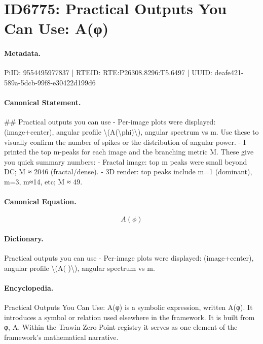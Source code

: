 \section*{ID6775: Practical Outputs You Can Use: A(φ)}
\paragraph{Metadata.}
PiID: 9554495977837 | RTEID: RTE:P26308.8296:T5.6497 | UUID: deafe421-589a-5dcb-99f8-e30422d199d6

\paragraph{Canonical Statement.}
\#\# Practical outputs you can use - Per-image plots were displayed: (image+center), angular profile \textbackslash{}(A(\textbackslash{}phi)\textbackslash{}), angular spectrum vs m. Use these to visually confirm the number of spikes or the distribution of angular power. - I printed the top m-peaks for each image and the branching metric M. These give you quick summary numbers: - Fractal image: top m peaks were small beyond DC; M ≈ 2046 (fractal/dense). - 3D render: top peaks include m=1 (dominant), m=3, m≈14, etc; M ≈ 49.

\paragraph{Canonical Equation.}
\[
A(\phi)
\]

\paragraph{Dictionary.}
Practical outputs you can use - Per-image plots were displayed: (image+center), angular profile \textbackslash{}(A( )\textbackslash{}), angular spectrum vs m.

\paragraph{Encyclopedia.}
Practical Outputs You Can Use: A(φ) is a symbolic expression, written A(φ). It introduces a symbol or relation used elsewhere in the framework. It is built from φ, A. Within the Trawin Zero Point registry it serves as one element of the framework's mathematical narrative.
